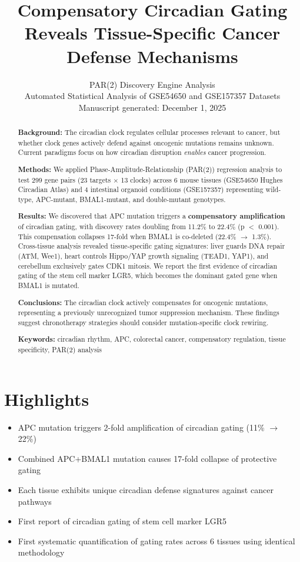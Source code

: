 \documentclass[11pt,letterpaper]{article}
\title{\textbf{Compensatory Circadian Gating Reveals Tissue-Specific Cancer Defense Mechanisms}}
\author{
PAR(2) Discovery Engine Analysis\\[0.5em]
\small{Automated Statistical Analysis of GSE54650 and GSE157357 Datasets}\\[1em]
\normalsize{Manuscript generated: December 1, 2025}
}
\date{}
\begin{document}
\maketitle

\begin{abstract}
\noindent\textbf{Background:} The circadian clock regulates cellular processes relevant to cancer, but whether clock genes actively defend against oncogenic mutations remains unknown. Current paradigms focus on how circadian disruption \textit{enables} cancer progression.

\noindent\textbf{Methods:} We applied Phase-Amplitude-Relationship (PAR(2)) regression analysis to test 299 gene pairs (23 targets $\times$ 13 clocks) across 6 mouse tissues (GSE54650 Hughes Circadian Atlas) and 4 intestinal organoid conditions (GSE157357) representing wild-type, APC-mutant, BMAL1-mutant, and double-mutant genotypes.

\noindent\textbf{Results:} We discovered that APC mutation triggers a \textbf{compensatory amplification} of circadian gating, with discovery rates doubling from 11.2\% to 22.4\% (p $<$ 0.001). This compensation collapses 17-fold when BMAL1 is co-deleted (22.4\% $\rightarrow$ 1.3\%). Cross-tissue analysis revealed tissue-specific gating signatures: liver guards DNA repair (ATM, Wee1), heart controls Hippo/YAP growth signaling (TEAD1, YAP1), and cerebellum exclusively gates CDK1 mitosis. We report the first evidence of circadian gating of the stem cell marker LGR5, which becomes the dominant gated gene when BMAL1 is mutated.

\noindent\textbf{Conclusions:} The circadian clock actively compensates for oncogenic mutations, representing a previously unrecognized tumor suppression mechanism. These findings suggest chronotherapy strategies should consider mutation-specific clock rewiring.

\noindent\textbf{Keywords:} circadian rhythm, APC, colorectal cancer, compensatory regulation, tissue specificity, PAR(2) analysis
\end{abstract}

\section*{Highlights}
\begin{itemize}
    \item APC mutation triggers 2-fold amplification of circadian gating (11\% $\rightarrow$ 22\%)
    \item Combined APC+BMAL1 mutation causes 17-fold collapse of protective gating
    \item Each tissue exhibits unique circadian defense signatures against cancer pathways
    \item First report of circadian gating of stem cell marker LGR5
    \item First systematic quantification of gating rates across 6 tissues using identical methodology
\end{itemize}
\end{document}
